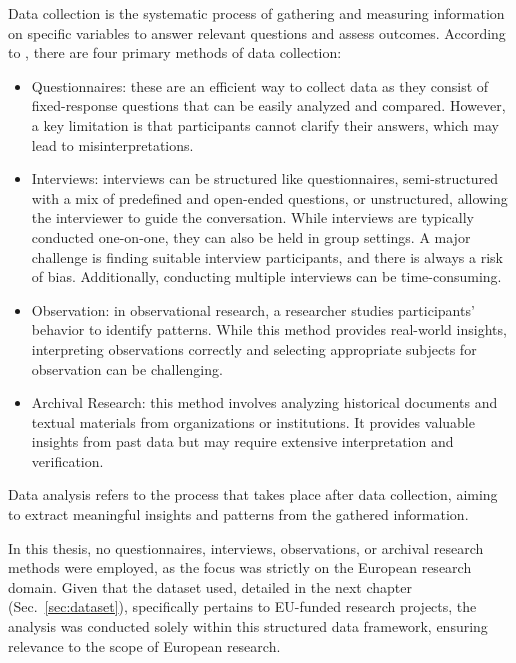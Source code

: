 Data collection is the systematic process of gathering and measuring information on specific variables to answer relevant questions and assess outcomes.
According to \textcite{SaundersMark2023}, there are four primary methods of data collection:
\begin{itemize}
    \item Questionnaires: these are an efficient way to collect data as they consist of fixed-response questions that can be easily analyzed and compared. However, a key limitation is that participants cannot clarify their answers, which may lead to misinterpretations.
    \item Interviews: interviews can be structured like questionnaires, semi-structured with a mix of predefined and open-ended questions, or unstructured, allowing the interviewer to guide the conversation. While interviews are typically conducted one-on-one, they can also be held in group settings. A major challenge is finding suitable interview participants, and there is always a risk of bias. Additionally, conducting multiple interviews can be time-consuming.
    \item Observation: in observational research, a researcher studies participants' behavior to identify patterns. While this method provides real-world insights, interpreting observations correctly and selecting appropriate subjects for observation can be challenging.
    \item Archival Research: this method involves analyzing historical documents and textual materials from organizations or institutions. It provides valuable insights from past data but may require extensive interpretation and verification.
\end{itemize}

Data analysis refers to the process that takes place after data collection, aiming to extract meaningful insights and patterns from the gathered information.

In this thesis, no questionnaires, interviews, observations, or archival research methods were employed, as the focus was strictly on the European research domain.
Given that the dataset used, detailed in the next chapter (Sec.~\ref{sec:dataset}), specifically pertains to EU-funded research projects, the analysis was conducted solely within this structured data framework, ensuring relevance to the scope of European research.